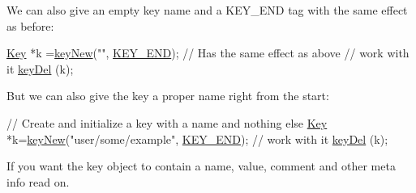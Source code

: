 We can also give an empty key name and a K\+E\+Y\+\_\+\+E\+ND tag with the same effect as before\+:


\begin{DoxyCodeInclude}
\hyperlink{classkdb_1_1Key_a5679f5cae63caddd64a60388b9cc77fa}{Key} *k =\hyperlink{group__key_gad23c65b44bf48d773759e1f9a4d43b89}{keyNew}(\textcolor{stringliteral}{""}, \hyperlink{group__key_gga91fb3178848bd682000958089abbaf40aa8adb6fcb92dec58fb19410eacfdd403}{KEY\_END}); \textcolor{comment}{// Has the same effect as above}
\textcolor{comment}{// work with it}
\hyperlink{group__key_ga3df95bbc2494e3e6703ece5639be5bb1}{keyDel} (k);
\end{DoxyCodeInclude}
 But we can also give the key a proper name right from the start\+:


\begin{DoxyCodeInclude}
\textcolor{comment}{// Create and initialize a key with a name and nothing else}
\hyperlink{classkdb_1_1Key_a5679f5cae63caddd64a60388b9cc77fa}{Key} *k=\hyperlink{group__key_gad23c65b44bf48d773759e1f9a4d43b89}{keyNew}(\textcolor{stringliteral}{"user/some/example"}, \hyperlink{group__key_gga91fb3178848bd682000958089abbaf40aa8adb6fcb92dec58fb19410eacfdd403}{KEY\_END});
\textcolor{comment}{// work with it}
\hyperlink{group__key_ga3df95bbc2494e3e6703ece5639be5bb1}{keyDel} (k);
\end{DoxyCodeInclude}
 If you want the key object to contain a name, value, comment and other meta info read on.

